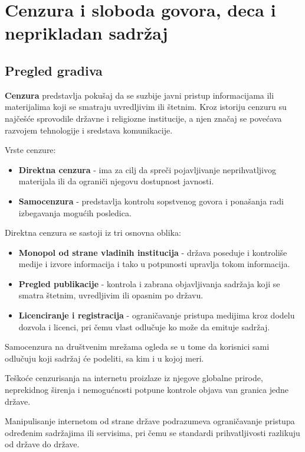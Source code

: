 \documentclass[a4paper, 12pt]{article}
\begin{document}
\section{Cenzura i sloboda govora, deca i neprikladan sadržaj}
\subsection{Pregled gradiva}
\textbf{Cenzura} predstavlja pokušaj da se suzbije javni pristup informacijama ili
materijalima koji se smatraju uvredljivim ili štetnim. 
Kroz istoriju cenzuru su najčešće sprovodile državne i religiozne institucije, a njen značaj 
se povećava razvojem tehnologije i sredstava komunikacije.

Vrste cenzure:
\begin{itemize}
    \item \textbf{Direktna cenzura} - ima za cilj da spreči pojavljivanje neprihvatljivog
    materijala ili da ograniči njegovu dostupnost javnosti.
    \item \textbf{Samocenzura} - predstavlja kontrolu sopstvenog govora i ponašanja radi
    izbegavanja mogućih posledica.
\end{itemize}

Direktna cenzura se sastoji iz tri osnovna oblika:
\begin{itemize}
    \item \textbf{Monopol od strane vladinih institucija} - država poseduje i kontroliše
    medije i izvore informacija i tako u potpunosti upravlja tokom informacija.
    \item \textbf{Pregled publikacije} - kontrola i zabrana objavljivanja sadržaja koji
    se smatra štetnim, uvredljivim ili opasnim po državu.
    \item \textbf{Licenciranje i registracija} - ograničavanje pristupa medijima kroz
    dodelu dozvola i licenci, pri čemu vlast odlučuje ko može da emituje sadržaj.
\end{itemize}

Samocenzura na društvenim mrežama ogleda se u tome da korisnici sami odlučuju
koji sadržaj će podeliti, sa kim i u kojoj meri.

Teškoće cenzurisanja na internetu proizlaze iz njegove globalne prirode,
neprekidnog širenja i nemogućnosti potpune kontrole objava van granica jedne
države.

Manipulisanje internetom od strane države podrazumeva ograničavanje pristupa
određenim sadržajima ili servisima, pri čemu se standardi prihvatljivosti
razlikuju od države do države.
\end{document}
